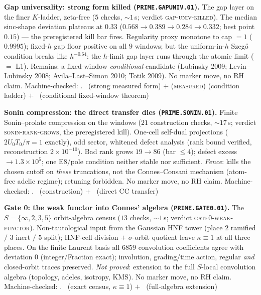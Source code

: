 \par\smallskip\noindent\textbf{Gap universality: strong form killed
(\texttt{PRIME.GAPUNIV.01}).}
The gap layer on the finer $K$-ladder, zeta-free ($5$ checks,
${\sim}1$\,s; verdict \textsc{gap-univ-killed}).  The median
sinc-shape deviation plateaus at $0.33$ ($0.568\to0.389\to0.284\to
0.332$; best point $0.15$) --- the preregistered kill bar fires.
Regularity proxy monotone to cap $=1$ ($0.9995$); fixed-$h$ gap
floor positive on all $9$ windows; but the uniform-in-$h$
Szeg\H{o} condition breaks like $h^{-0.64}$: the $h$-limit gap
layer runs through the atomic limit ($=$ L1).  Remains: a
fixed-window \emph{conditional} candidate (Lubinsky 2009;
Levin--Lubinsky 2008; Avila--Last--Simon 2010; Totik 2009).  No
marker move, no RH claim.
Machine-checked: .
\mX\ (strong measured form) $+$ (\textsc{measured}) (condition
ladder) $+$ \mO\ (conditional fixed-window theorem)
\par\smallskip


\par\smallskip\noindent\textbf{Sonin compression: the direct
transfer dies (\texttt{PRIME.SONIN.01}).}
Finite Sonin--prolate compression on the windows ($21$ construction
checks, ${\sim}17$\,s; verdict \textsc{sonin-rank-grows}, the
preregistered kill).  One-cell self-dual projections
($2U_0T_0/\pi=1$ exactly), odd sector, whitened defect analysis
(rank bound verified, reconstruction $2\times10^{-10}$).  Bad rank
grows $19\to86$ (bar $\le4$); defect excess $\to1.3\times10^{5}$;
one E8/pole condition neither stable nor sufficient.  \emph{Fence}:
kills the chosen cutoff on \emph{these} truncations, not the
Connes--Consani mechanism (atom-free adelic regime); retuning
forbidden.  No marker move, no RH claim.
Machine-checked: .
\mE\ (construction) $+$ \mX\ (direct CC transfer)
\par\smallskip


\par\smallskip\noindent\textbf{Gate 0: the weak functor into
Connes' algebra (\texttt{PRIME.GATE0.01}).}
The $S=\{\infty,2,3,5\}$ orbit-algebra census ($13$ checks,
${\sim}1$\,s; verdict \textsc{gate0-weak-functor}).  Non-tautological
input from the Gaussian HNF tower (place $2$ ramified $/$ $3$ inert
$/$ $5$ split); HNF-cell division $+$ $\sigma$-orbit quotient leave
$\kappa\equiv1$ at all three places.  On the finite Laurent basis
all $6859$ convolution coefficients agree with deviation $0$
(integer/Fraction exact); involution, grading/time action, regular
\emph{and} closed-orbit traces preserved.  \emph{Not proved}:
extension to the full $S$-local convolution algebra (topology,
adeles, isotropy, KMS).  No marker move, no RH claim.
Machine-checked: .
\mE\ (exact census, $\kappa\equiv1$) $+$ \mO\ (full-algebra
extension)
\par\smallskip


